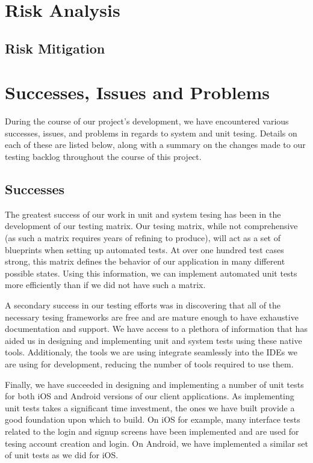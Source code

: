 

\section{Risk Analysis}

\subsection{Risk Mitigation}

\section{Successes, Issues and Problems}

During the course of our project's development, we have encountered various
successes, issues, and problems in regards to system and unit tesing. Details on
each of these are listed below, along with a summary on the changes made to our
testing backlog throughout the course of this project.


\subsection{Successes}

The greatest success of our work in unit and system tesing has been in the
development of our testing matrix. Our tesing matrix, while not comprehensive
(as such a matrix requires years of refining to produce), will act as a set of
blueprints when setting up automated tests. At over one hundred test cases
strong, this matrix defines the behavior of our application in many different
possible states. Using this information, we can implement automated unit tests
more efficiently than if we did not have such a matrix.

A secondary success in our testing efforts was in discovering that all of the
necessary tesing frameworks are free and are mature enough to have exhaustive
documentation and support. We have access to a plethora of information that has
aided us in designing and implementing unit and system tests using these native
tools. Additionaly, the tools we are using integrate seamlessly into the IDEs we
are using for development, reducing the number of tools required to use them.

Finally, we have succeeded in designing and implementing a number of unit tests
for both iOS and Android versions of our client applications. As implementing
unit tests takes a significant time investment, the ones we have built provide a
good foundation upon which to build. On iOS for example, many interface tests
related to the login and signup screens have been implemented and are used for
tesing account creation and login. On Android, we have implemented a similar set
of unit tests as we did for iOS.


